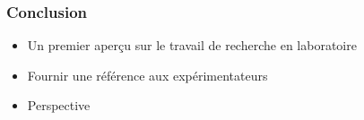 \documentclass[a4paper, 12pt, twoside, titlepage, french]{beamer}
\begin{document}

\begin{frame}
\frametitle{Conclusion}
\begin{itemize}
\item Un premier aperçu sur le travail de recherche en laboratoire
\item Fournir une référence aux expérimentateurs
\item Perspective
\end{itemize}

\end{frame}
\end{document}
